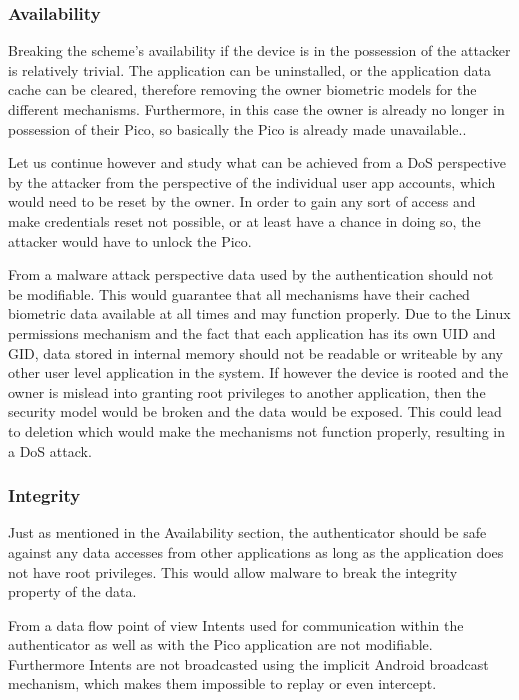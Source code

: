\subsubsection*{Availability}
Breaking the scheme's availability if the device is in the possession of the attacker is relatively trivial. The application can be uninstalled, or the application data cache can be cleared, therefore removing the owner biometric models for the different mechanisms. Furthermore, in this case the owner is already no longer in possession of their Pico, so basically the Pico is already made unavailable..

Let us continue however and study what can be achieved from a DoS perspective by the attacker from the perspective of the individual user app accounts, which would need to be reset by the owner. In order to gain any sort of access and make credentials reset not possible, or at least have a chance in doing so, the attacker would have to unlock the Pico.

From a malware attack perspective data used by the authentication should not be modifiable. This would guarantee that all mechanisms have their cached biometric data available at all times and may function properly. Due to the Linux permissions mechanism and the fact that each application has its own UID and GID, data stored in internal memory should not be readable or writeable by any other user level application in the system. If however the device is rooted and the owner is mislead into granting root privileges to another application, then the security model would be broken and the data would be exposed. This could lead to deletion which would make the mechanisms not function properly, resulting in a DoS attack.


\subsubsection*{Integrity}
Just as mentioned in the Availability section, the authenticator should be safe against any data accesses from other applications as long as the application does not have root privileges. This would allow malware to break the integrity property of the data.

From a data flow point of view Intents used for communication within the authenticator as well as with the Pico application are not modifiable. Furthermore Intents are not broadcasted using the implicit Android broadcast mechanism, which makes them impossible to replay or even intercept.

